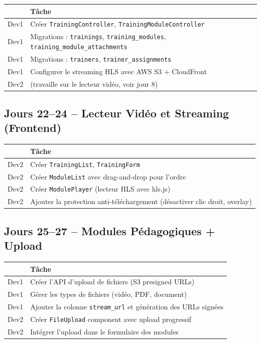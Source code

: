 \documentclass[12pt,a4paper]{report}
\begin{document}
\begin{tabularx}{\textwidth}{l X}
    \toprule
    & \textbf{Tâche} \\
    \midrule
    Dev1 & Créer \texttt{TrainingController}, \texttt{TrainingModuleController} \\
    Dev1 & Migrations : \texttt{trainings}, \texttt{training\_modules}, \texttt{training\_module\_attachments} \\
    Dev1 & Migrations : \texttt{trainers}, \texttt{trainer\_assignments} \\
    Dev1 & Configurer le streaming HLS avec AWS S3 + CloudFront \\
    Dev2 & (travaille sur le lecteur vidéo, voir jour 8) \\
    \bottomrule
\end{tabularx}

\subsection*{Jours 22--24 -- Lecteur Vidéo et Streaming (Frontend)}

\begin{tabularx}{\textwidth}{l X}
    \toprule
    & \textbf{Tâche} \\
    \midrule
    Dev2 & Créer \texttt{TrainingList}, \texttt{TrainingForm} \\
    Dev2 & Créer \texttt{ModuleList} avec drag-and-drop pour l'ordre \\
    Dev2 & Créer \texttt{ModulePlayer} (lecteur HLS avec hls.js) \\
    Dev2 & Ajouter la protection anti-téléchargement (désactiver clic droit, overlay) \\
    \bottomrule
\end{tabularx}

\subsection*{Jours 25--27 -- Modules Pédagogiques + Upload}

\begin{tabularx}{\textwidth}{l X}
    \toprule
    & \textbf{Tâche} \\
    \midrule
    Dev1 & Créer l'API d'upload de fichiers (S3 presigned URLs) \\
    Dev1 & Gérer les types de fichiers (vidéo, PDF, document) \\
    Dev1 & Ajouter la colonne \texttt{stream\_url} et génération des URLs signées \\
    Dev2 & Créer \texttt{FileUpload} component avec upload progressif \\
    Dev2 & Intégrer l'upload dans le formulaire des modules \\
    \bottomrule
\end{tabularx}
\end{document}
